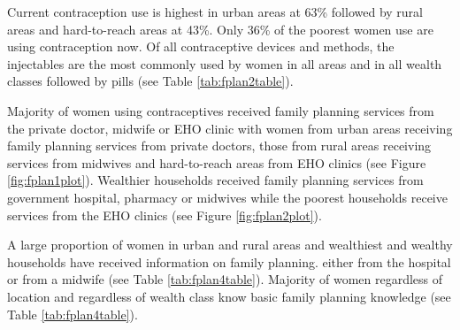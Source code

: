 \documentclass[12pt,a4paper]{article}
\begin{document}
Current contraception use is highest in urban areas at 63\% followed by rural areas and hard-to-reach areas at 43\%. Only 36\% of the poorest women use are using contraception now. Of all contraceptive devices and methods, the injectables are the most commonly used by women in all areas and in all wealth classes followed by pills (see Table \ref{tab:fplan2table}).

Majority of women using contraceptives received family planning services from the private doctor, midwife or EHO clinic with women from urban areas receiving family planning services from private doctors, those from rural areas receiving services from midwives and hard-to-reach areas from EHO clinics (see Figure \ref{fig:fplan1plot}). Wealthier households received family planning services from government hospital, pharmacy or midwives while the poorest households receive services from the EHO clinics (see Figure \ref{fig:fplan2plot}).

A large proportion of women in urban and rural areas and wealthiest and wealthy households have received information on family planning. either from the hospital or from a midwife (see Table \ref{tab:fplan4table}). Majority of women regardless of location and regardless of wealth class know basic family planning knowledge (see Table \ref{tab:fplan4table}).
\end{document}
